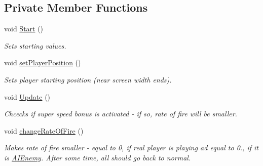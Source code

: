 \subsection*{Private Member Functions}
\begin{DoxyCompactItemize}
\item 
void \mbox{\hyperlink{class_player_attributes_afa03395e71444c6bbaa339236b13ff64}{Start}} ()
\begin{DoxyCompactList}\small\item\em Sets starting values. \end{DoxyCompactList}\item 
void \mbox{\hyperlink{class_player_attributes_a9c30141dd1440bd1495b69b0f261190c}{set\+Player\+Position}} ()
\begin{DoxyCompactList}\small\item\em Sets player starting position (near screen width ends). \end{DoxyCompactList}\item 
void \mbox{\hyperlink{class_player_attributes_a5b1eb70086158522067e99f7900b679c}{Update}} ()
\begin{DoxyCompactList}\small\item\em Chcecks if super speed bonus is activated -\/ if so, rate of fire will be smaller. \end{DoxyCompactList}\item 
void \mbox{\hyperlink{class_player_attributes_a536939a7d2aedf70cfc7a2359ac1784f}{change\+Rate\+Of\+Fire}} ()
\begin{DoxyCompactList}\small\item\em Makes rate of fire smaller -\/ equal to 0, if real player is playing ad equal to 0., if it is \mbox{\hyperlink{class_a_i_enemy}{A\+I\+Enemy}}. After some time, all should go back to normal. \end{DoxyCompactList}\end{DoxyCompactItemize}

